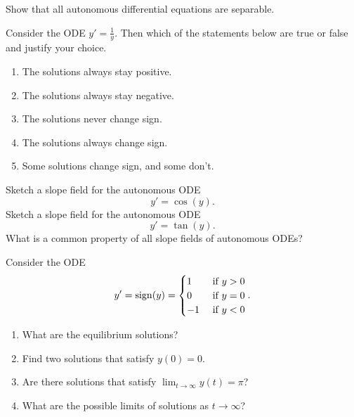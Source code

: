 \begin{exercises}

	\begin{problist}
	\prob Show that all autonomous differential equations are separable.
	
	\prob Consider the ODE $y'=\displaystyle \frac1y$.
	Then which of the statements below are true or false and justify your choice.
	\begin{enumerate}
		\item The solutions always stay positive.
		\item The solutions always stay negative.
		\item The solutions never change sign.
		\item The solutions always change sign.
		\item Some solutions change sign, and some don't.
	\end{enumerate}
	
	\prob Sketch a slope field for the autonomous ODE $$y'=\cos(y).$$
	\prob Sketch a slope field for the autonomous ODE $$y'=\tan(y).$$
	\prob What is a common property of all slope fields of autonomous ODEs?
	
	
	\prob Consider the ODE
	$$ 
	y' = {\rm sign}(y) = 
		\begin{cases}
			1 & \text{ if } y > 0 \\	
			0 & \text{ if } y = 0 \\	
			-1 & \text{ if } y < 0
		\end{cases}. 
	$$

	\begin{enumerate}
		\item What are the equilibrium solutions?
		\item Find two solutions that satisfy $y(0)=0$.
		\item Are there solutions that satisfy $\displaystyle \lim_{t \to \infty} y(t) = \pi$?
		\item What are the possible limits of solutions as $t\to \infty$?
	\end{enumerate}
	





\end{problist}
\end{exercises}
